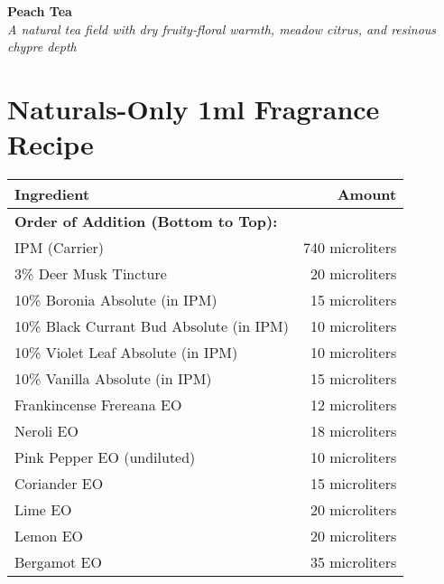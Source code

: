 \documentclass{article}
\begin{document}
\begin{center}
\textcolor{violetPurple}{\LARGE\textbf{Peach Tea}}\\[0.5cm]
\textcolor{colaBrown}{\large\textit{A natural tea field with dry fruity-floral warmth, meadow citrus, and resinous chypre depth}}\\[0.5cm]
\end{center}

\section*{Naturals-Only 1ml Fragrance Recipe}

\begin{center}
\begin{tabular}{p{6.5cm}r}
\toprule
\textcolor{colaRed}{\textbf{Ingredient}} & \textcolor{colaRed}{\textbf{Amount}} \\
\midrule
\multicolumn{2}{l}{\textcolor{violetPurple}{\textbf{Order of Addition (Bottom to Top):}}} \\
\midrule
IPM (Carrier) & 740 microliters \\
3\% Deer Musk Tincture & 20 microliters \\
10\% Boronia Absolute (in IPM) & 15 microliters \\
10\% Black Currant Bud Absolute (in IPM) & 10 microliters \\
10\% Violet Leaf Absolute (in IPM) & 10 microliters \\
10\% Vanilla Absolute (in IPM) & 15 microliters \\
Frankincense Frereana EO & 12 microliters \\
Neroli EO & 18 microliters \\
Pink Pepper EO (undiluted) & 10 microliters \\
Coriander EO & 15 microliters \\
Lime EO & 20 microliters \\
Lemon EO & 20 microliters \\
Bergamot EO & 35 microliters \\
\bottomrule
\end{tabular}
\end{center}

\vspace{0.5cm}
\end{document}
